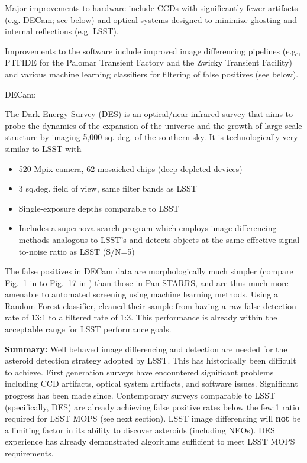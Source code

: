 \documentclass[12pt,preprint]{aastex}
\begin{document}
Major improvements to hardware include CCDs with significantly fewer 
artifacts (e.g. DECam; see below) and optical systems designed to
minimize ghosting and internal reflections (e.g. LSST). 

Improvements to the software include improved image differencing
pipelines (e.g., PTFIDE for the Palomar Transient Factory and the
Zwicky Transient Facility) and various machine learning classifiers
for filtering of false positives (see below). 

DECam: \cite{goldstein15} 

The Dark Energy Survey (DES) is an optical/near-infrared survey that
aims to probe the dynamics of the expansion of the universe and the
growth of large scale structure by imaging 5,000 sq. deg. of the
southern sky. It is technologically very similar to LSST with
\begin{itemize}
\item 520 Mpix camera, 62 mosaicked chips (deep depleted devices)
\item 3 sq.deg. field of view, same filter bands as LSST
\item Single-exposure depths comparable to LSST
\item Includes a supernova search program which employs image
differencing methods analogous to LSST’s  and detects objects at the 
same effective signal-to-noise ratio as LSST (S/N=5)
\end{itemize} 

The false positives in DECam data are morphologically much simpler
(compare Fig.~1 in \citep{goldstein15} to Fig.~17 in \citep{denneau13})
than those in Pan-STARRS, and are thus much more amenable to automated 
screening using machine learning methods. Using a Random Forest 
classifier, \cite{goldstein15} cleaned their sample from having a 
raw false detection rate of 13:1 to a filtered rate of 1:3. This performance
is already within the acceptable range for LSST performance goals. 



{\bf Summary:} Well behaved image differencing and detection are needed for the
asteroid detection strategy adopted by LSST. This has historically
been difficult to achieve. First generation surveys have encountered
significant problems including CCD artifacts, optical system
artifacts, and software issues. Significant progress has been made
since. Contemporary surveys comparable to LSST (specifically, DES) are
already achieving false positive rates below the few:1 ratio required
for LSST MOPS (see next section). LSST image differencing will {\bf
not} be a limiting factor in its ability to discover asteroids
(including NEOs). DES experience has already demonstrated algorithms 
sufficient to meet LSST MOPS requirements.
\end{document}
